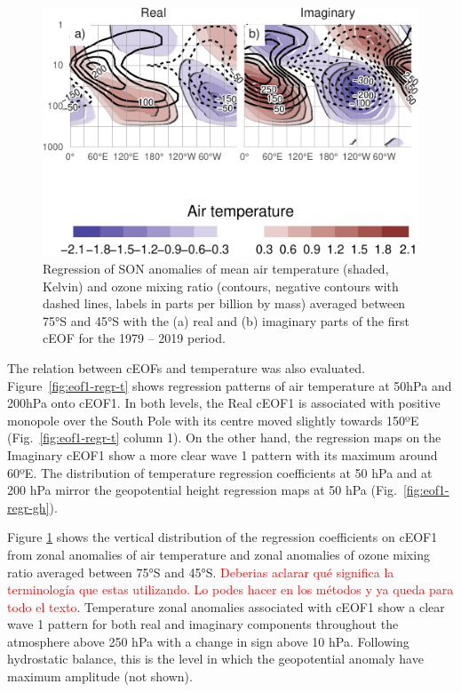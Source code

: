 \documentclass[smallextended]{svjour3}       %
\begin{document}
\begin{figure}
\centering
\includegraphics{../figures/t-vertical-1.pdf}
\caption{\label{fig:t-vertical}Regression of SON anomalies of mean air temperature (shaded, Kelvin) and ozone mixing ratio (contours, negative contours with dashed lines, labels in parts per billion by mass) averaged between 75°S and 45°S with the (a) real and (b) imaginary parts of the first cEOF for the 1979 -- 2019 period.}
\end{figure}

The relation between cEOFs and temperature was also evaluated.
Figure~\ref{fig:eof1-regr-t} shows regression patterns of air temperature at 50hPa and 200hPa onto cEOF1.
In both levels, the Real cEOF1 is associated with positive monopole over the South Pole with its centre moved slightly towards 150ºE (Fig.~\ref{fig:eof1-regr-t} column 1).
On the other hand, the regression maps on the Imaginary cEOF1 show a more clear wave 1 pattern with its maximum around 60ºE.
The distribution of temperature regression coefficients at 50 hPa and at 200 hPa mirror the geopotential height regression maps at 50 hPa (Fig.~\ref{fig:eof1-regr-gh}).

Figure \ref{fig:t-vertical} shows the vertical distribution of the regression coefficients on cEOF1 from zonal anomalies of air temperature and zonal anomalies of ozone mixing ratio averaged between 75°S and 45°S.
\textcolor{red}{Deberias aclarar qué significa la terminología que estas utilizando. Lo podes hacer en los métodos y ya queda para todo el texto}.
Temperature zonal anomalies associated with cEOF1 show a clear wave 1 pattern for both real and imaginary components throughout the atmosphere above 250 hPa with a change in sign above 10 hPa.
Following hydrostatic balance, this is the level in which the geopotential anomaly have maximum amplitude (not shown).
\end{document}
